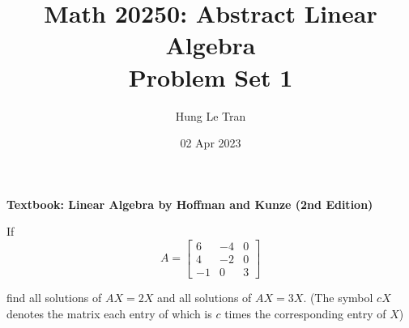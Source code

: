 \documentclass[a4paper, 11pt]{article}
\title{Math 20250: Abstract Linear Algebra \\ \large Problem Set 1}
\date{02 Apr 2023}
\author{Hung Le Tran}
\begin{document}
\maketitle
\newpage
\setcounter{section}{1}
\textbf{Textbook: Linear Algebra by Hoffman and Kunze (2nd Edition)}
\begin{problem} 
If \[
    A = \left[\begin{array}{ccc}
            6  & -4 & 0 \\
            4  & -2 & 0 \\
            -1 & 0  & 3
        \end{array}\right]
\]

find all solutions of \(AX = 2X\) and all solutions of \(AX = 3X\). (The symbol \(cX\) denotes the matrix each entry of which is \(c\) times the corresponding entry of \(X\))
\end{problem}
\end{document}
